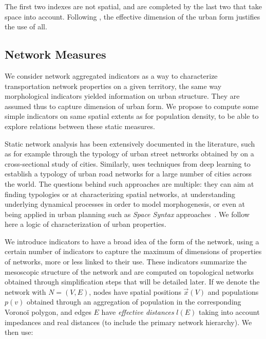 The first two indexes are not spatial, and are completed by the last two that take space into account. Following \cite{Schwarz201029}, the effective dimension of the urban form justifies the use of all.


\subsection{Network Measures}


We consider network aggregated indicators as a way to characterize transportation network properties on a given territory, the same way morphological indicators yielded information on urban structure. They are assumed thus to capture  dimension of urban form. We propose to compute some simple indicators on same spatial extents as for population density, to be able to explore relations between these static measures.

Static network analysis has been extensively documented in the literature, such as for example through the typology of urban street networks obtained by \cite{louf2014typology} on a cross-sectional study of cities. Similarly, \cite{2017arXiv170902939M} uses techniques from deep learning to establish a typology of urban road networks for a large number of cities across the world. The questions behind such approaches are multiple: they can aim at finding typologies or at characterizing spatial networks, at understanding underlying dynamical processes in order to model morphogenesis, or even at being applied in urban planning such as \emph{Space Syntax} approaches~\citep{hillier1989social}. We follow here a logic of characterization of urban properties.


We introduce indicators to have a broad idea of the form of the network, using a certain number of indicators to capture the maximum of dimensions of properties of networks, more or less linked to their use. These indicators summarize the mesoscopic structure of the network and are computed on topological networks obtained through simplification steps that will be detailed later. If we denote the network with $N=(V,E)$, nodes have spatial positions $\vec{x}(V)$ and populations $p(v)$ obtained through an aggregation of population in the corresponding Voronoï polygon, and edges $E$ have \emph{effective distances} $l(E)$ taking into account impedances and real distances (to include the primary network hierarchy). We then use:

